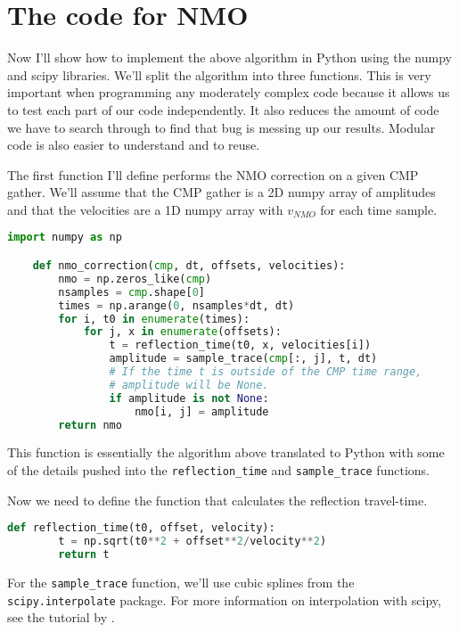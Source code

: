 \section{The code for NMO}

Now I'll show how to implement the above algorithm in Python using the numpy and scipy libraries.
We'll split the algorithm into three functions.
This is very important when programming any moderately complex code because it allows us to test each part of our code independently.
It also reduces the amount of code we have to search through to find that bug is messing up our results.
Modular code is also easier to understand and to reuse.

The first function I'll define performs the NMO correction on a given CMP gather.
We'll assume that the CMP gather is a 2D numpy array of amplitudes and that the
velocities are a 1D numpy array with $v_{NMO}$ for each time sample.

\begin{lstlisting}[language=python]
    import numpy as np

    def nmo_correction(cmp, dt, offsets, velocities):
        nmo = np.zeros_like(cmp)
        nsamples = cmp.shape[0]
        times = np.arange(0, nsamples*dt, dt)
        for i, t0 in enumerate(times):
            for j, x in enumerate(offsets):
                t = reflection_time(t0, x, velocities[i])
                amplitude = sample_trace(cmp[:, j], t, dt)
                # If the time t is outside of the CMP time range,
                # amplitude will be None.
                if amplitude is not None:
                    nmo[i, j] = amplitude
        return nmo
\end{lstlisting}

This function is essentially the algorithm above translated to Python with some
of the details pushed into the \texttt{reflection\_time} and
\texttt{sample\_trace} functions.

Now we need to define the function that calculates the reflection travel-time.

\begin{lstlisting}[language=python]
    def reflection_time(t0, offset, velocity):
        t = np.sqrt(t0**2 + offset**2/velocity**2)
        return t
\end{lstlisting}

For the \texttt{sample\_trace} function, we'll use cubic splines from the
\texttt{scipy.interpolate} package.
For more information on interpolation with scipy, see the tutorial by
\citet{Hall_2016}.

